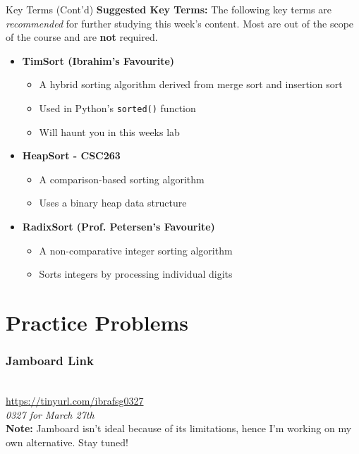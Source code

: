 \documentclass[hyperref={colorlinks,citecolor=blue,linkcolor=blue,urlcolor=blue}, aspectratio=1610]{beamer}
\begin{document}
\begin{frame}{Key Terms (Cont'd)}
  \textbf{Suggested Key Terms:} The following key terms are \textit{recommended} for further studying this week's content. Most are out of the scope of the course and are \textbf{not} required. 
  \begin{itemize} 
    \item \textbf{TimSort (Ibrahim's Favourite)}
    \begin{itemize}
      \item A hybrid sorting algorithm derived from merge sort and insertion sort
      \item Used in Python's \texttt{sorted()} function
      \item Will haunt you in this weeks lab
    \end{itemize}
    \item \textbf{HeapSort - CSC263}
    \begin{itemize}
      \item A comparison-based sorting algorithm
      \item Uses a binary heap data structure
    \end{itemize}
    \item \textbf{RadixSort (Prof. Petersen's Favourite)}
    \begin{itemize}
      \item A non-comparative integer sorting algorithm
      \item Sorts integers by processing individual digits
    \end{itemize}
  \end{itemize}

\end{frame}

\section{Practice Problems}

\begin{frame}
  \frametitle{Jamboard Link}
  \begin{center}
    \\
    \url{https://tinyurl.com/ibrafsg0327}\\
    \textit{0327 for March 27th}\\
    \textbf{Note:} Jamboard isn't ideal because of its limitations, hence I'm working on my own alternative. Stay tuned!
  \end{center}
\end{frame}
\end{document}
